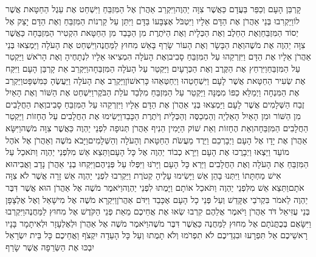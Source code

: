 \documentclass[../main/main.tex]{subfiles}
\begin{document}
\begin{multicols*}{\ncols}
קָרְבַּן הָעָם וְכַפֵּר בַּעֲדָם כַּאֲשֶׁר צִוָּה יַהְוֶה\PreVerseSpace{}וַיִּקְרַב אַהֲרֹן אֶל הַמִּזְבֵּחַ וַיִּשְׁחַט אֶת עֵגֶל הַחַטָּאת אֲשֶׁר לוֹ\PreVerseSpace{}וַיַּקְרִבוּ בְּנֵי אַהֲרֹן אֶת הַדָּם אֵלָיו וַיִּטְבֹּל אֶצְבָּעוֹ בַּדָּם וַיִּתֵּן עַל קַרְנוֹת הַמִּזְבֵּחַ וְאֶת הַדָּם יָצַק אֶל יְסוֹד הַמִּזְבֵּחַ\PreVerseSpace{}וְאֶת הַחֵלֶב וְאֶת הַכְּלָיֹת וְאֶת הַיֹּתֶרֶת מִן הַכָּבֵד מִן הַחַטָּאת הִקְטִיר הַמִּזְבֵּחָה כַּאֲשֶׁר צִוָּה יַהְוֶה אֶת מֹשֶׁה\PreVerseSpace{}וְאֶת הַבָּשָׂר וְאֶת הָעוֹר שָׂרַף בָּאֵשׁ מִחוּץ לַמַּחֲנֶה\PreVerseSpace{}וַיִּשְׁחַט אֶת הָעֹלָה וַיַּמְצִאוּ בְּנֵי אַהֲרֹן אֵלָיו אֶת הַדָּם וַיִּזְרְקֵהוּ עַל הַמִּזְבֵּחַ סָבִיב\PreVerseSpace{}וְאֶת הָעֹלָה הִמְצִיאוּ אֵלָיו לִנְתָחֶיהָ וְאֶת הָרֹאשׁ וַיַּקְטֵר עַל הַמִּזְבֵּחַ\PreVerseSpace{}וַיִּרְחַץ אֶת הַקֶּרֶב וְאֶת הַכְּרָעָיִם וַיַּקְטֵר עַל הָעֹלָה הַמִּזְבֵּחָה\PreVerseSpace{}וַיַּקְרֵב אֵת קָרְבַּן הָעָם וַיִּקַּח אֶת שְׂעִיר הַחַטָּאת אֲשֶׁר לָעָם וַיִּשְׁחָטֵהוּ וַיְחַטְּאֵהוּ כָּרִאשׁוֹן\PreVerseSpace{}וַיַּקְרֵב אֶת הָעֹלָה וַיַּעֲשֶׂהָ כַּמִּשְׁפָּט\PreVerseSpace{}וַיַּקְרֵב אֶת הַמִּנְחָה וַיְמַלֵּא כַפּוֹ מִמֶּנָּה וַיַּקְטֵר עַל הַמִּזְבֵּחַ מִלְּבַד עֹלַת הַבֹּקֶר\PreVerseSpace{}וַיִּשְׁחַט אֶת הַשּׁוֹר וְאֶת הָאַיִל זֶבַח הַשְּׁלָמִים אֲשֶׁר לָעָם וַיַּמְצִאוּ בְּנֵי אַהֲרֹן אֶת הַדָּם אֵלָיו וַיִּזְרְקֵהוּ עַל הַמִּזְבֵּחַ סָבִיב\PreVerseSpace{}וְאֶת הַחֲלָבִים מִן הַשּׁוֹר וּמִן הָאַיִל הָאַלְיָה וְהַמְכַסֶּה וְהַכְּלָיֹת וְיֹתֶרֶת הַכָּבֵד\PreVerseSpace{}וַיָּשִׂימוּ אֶת הַחֲלָבִים עַל הֶחָזוֹת וַיַּקְטֵר הַחֲלָבִים הַמִּזְבֵּחָה\PreVerseSpace{}וְאֵת הֶחָזוֹת וְאֵת שׁוֹק הַיָּמִין הֵנִיף אַהֲרֹן תְּנוּפָה לִפְנֵי יַהְוֶה כַּאֲשֶׁר צִוָּה מֹשֶׁה\PreVerseSpace{}וַיִּשָּׂא אַהֲרֹן אֶת יָדָו אֶל הָעָם וַיְבָרְכֵם וַיֵּרֶד מֵעֲשֹׂת הַחַטָּאת וְהָעֹלָה וְהַשְּׁלָמִים\PreVerseSpace{}וַיָּבֹא מֹשֶׁה וְאַהֲרֹן אֶל אֹהֶל מוֹעֵד וַיֵּצְאוּ וַיְבָרֲכוּ אֶת הָעָם וַיֵּרָא כְבוֹד יַהְוֶה אֶל כָּל הָעָם\PreVerseSpace{}וַתֵּצֵא אֵשׁ מִלִּפְנֵי יַהְוֶה וַתֹּאכַל עַל הַמִּזְבֵּחַ אֶת הָעֹלָה וְאֶת הַחֲלָבִים וַיַּרְא כָּל הָעָם וַיָּרֹנּוּ וַיִּפְּלוּ עַל פְּנֵיהֶם\PreChapterSpace{}וַיִּקְחוּ בְנֵי אַהֲרֹן נָדָב וַאֲבִיהוּא אִישׁ מַחְתָּתוֹ וַיִּתְּנוּ בָהֵן אֵשׁ וַיָּשִׂימוּ עָלֶיהָ קְטֹרֶת וַיַּקְרִבוּ לִפְנֵי יַהְוֶה אֵשׁ זָרָה אֲשֶׁר לֹא צִוָּה אֹתָם\PreVerseSpace{}וַתֵּצֵא אֵשׁ מִלִּפְנֵי יַהְוֶה וַתֹּאכַל אוֹתָם וַיָּמֻתוּ לִפְנֵי יַהְוֶה\PreVerseSpace{}וַיֹּאמֶר מֹשֶׁה אֶל אַהֲרֹן הוּא אֲשֶׁר דִּבֶּר יַהְוֶה לֵאמֹר בִּקְרֹבַי אֶקָּדֵשׁ וְעַל פְּנֵי כָל הָעָם אֶכָּבֵד וַיִּדֹּם אַהֲרֹן\PreVerseSpace{}וַיִּקְרָא מֹשֶׁה אֶל מִישָׁאֵל וְאֶל אֶלְצָפָן בְּנֵי עֻזִּיאֵל דֹּד אַהֲרֹן וַיֹּאמֶר אֲלֵהֶם קִרְבוּ שְׂאוּ אֶת אֲחֵיכֶם מֵאֵת פְּנֵי הַקֹּדֶשׁ אֶל מִחוּץ לַמַּחֲנֶה\PreVerseSpace{}וַיִּקְרְבוּ וַיִּשָּׂאֻם בְּכֻתֳּנֹתָם אֶל מִחוּץ לַמַּחֲנֶה כַּאֲשֶׁר דִּבֶּר מֹשֶׁה\PreVerseSpace{}וַיֹּאמֶר מֹשֶׁה אֶל אַהֲרֹן וּלְאֶלְעָזָר וּלְאִיתָמָר בָּנָיו רָאשֵׁיכֶם אַל תִּפְרָעוּ וּבִגְדֵיכֶם לֹא תִפְרֹמוּ וְלֹא תָמֻתוּ וְעַל כָּל הָעֵדָה יִקְצֹף וַאֲחֵיכֶם כָּל בֵּית יִשְׂרָאֵל יִבְכּוּ אֶת הַשְּׂרֵפָה אֲשֶׁר שָׂרַף 
\end{multicols*}
\end{document}
